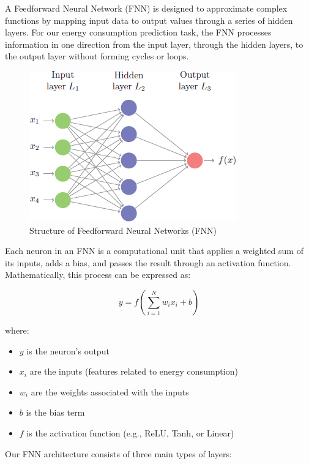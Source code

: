 A Feedforward Neural Network (FNN) is designed to approximate complex functions by mapping input data to output values through a series of hidden layers. For our energy consumption prediction task, the FNN processes information in one direction from the input layer, through the hidden layers, to the output layer without forming cycles or loops.

\begin{figure}[h!]
    \centering
    \includegraphics[width=0.8\linewidth]{images/fnn-struture.png}
    \caption{Structure of Feedforward Neural Networks (FNN)}
    \label{fig:feedforward_structure}
\end{figure}

Each neuron in an FNN is a computational unit that applies a weighted sum of its inputs, adds a bias, and passes the result through an activation function. Mathematically, this process can be expressed as:

\[
    y = f(\sum_{i=1}^{N} w_ix_i + b)
\]

where:

\begin{itemize}
    \item $y$ is the neuron's output
    \item $x_i$ are the inputs (features related to energy consumption)
    \item $w_i$ are the weights associated with the inputs
    \item $b$ is the bias term
    \item $f$ is the activation function (e.g., ReLU, Tanh, or Linear)
\end{itemize}

Our FNN architecture consists of three main types of layers:

